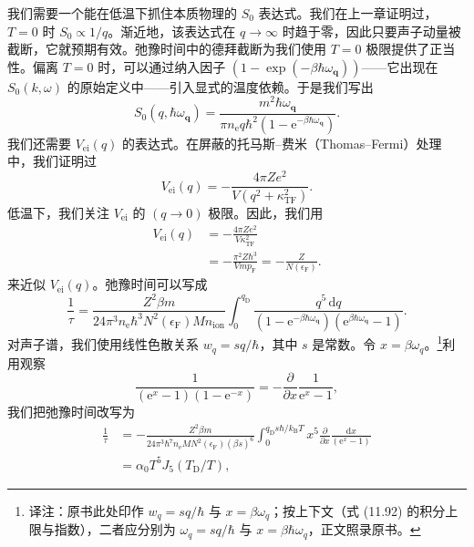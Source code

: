 我们需要一个能在低温下抓住本质物理的 $S_0$ 表达式。我们在上一章证明过，$T=0$ 时 $S_0\propto 1/q$。渐近地，该表达式在 $q\to\infty$ 时趋于零，因此只要声子动量被截断，它就预期有效。弛豫时间中的德拜截断为我们使用 $T=0$ 极限提供了正当性。偏离 $T=0$ 时，可以通过纳入因子 $(1-\exp(-\beta\hbar\omega_{\mathbf{q}}))$——它出现在 $S_0(k,\omega)$ 的原始定义中——引入显式的温度依赖。于是我们写出
\begin{equation*}
S_0(q,\hbar\omega_{\mathbf{q}})=\frac{m^2\hbar\omega_{\mathbf{q}}}{\pi n_{\mathrm{e}}q\hbar^2(1-\mathrm{e}^{-\beta\hbar\omega_{\mathbf{q}}})}.\tag{11.87}
\end{equation*}
我们还需要 $V_{\mathrm{ei}}(q)$ 的表达式。在屏蔽的托马斯–费米（Thomas--Fermi）处理中，我们证明过
\begin{equation*}
V_{\mathrm{ei}}(q)=-\frac{4\pi Ze^2}{V(q^2+\kappa_{\mathrm{TF}}^2)}.\tag{11.88}
\end{equation*}
低温下，我们关注 $V_{\mathrm{ei}}$ 的 $(q\to 0)$ 极限。因此，我们用
\begin{equation*}
\begin{aligned}
V_{\mathrm{ei}}(q)&=-\frac{4\pi Ze^2}{V\kappa_{\mathrm{TF}}^2}\\
&=-\frac{\pi^2Z\hbar^3}{Vmp_{\mathrm{F}}}=-\frac{Z}{N(\epsilon_{\mathrm{F}})}.
\end{aligned}\tag{11.89}
\end{equation*}
来近似 $V_{\mathrm{ei}}(q)$。弛豫时间可以写成
\begin{equation*}
\frac{1}{\tau}=\frac{Z^2\beta m}{24\pi^3 n_{\mathrm{e}}\hbar^3N^2(\epsilon_{\mathrm{F}})Mn_{\mathrm{ion}}}\int_0^{q_{\mathrm{D}}}\frac{q^5\,\mathrm{d}q}{(1-\mathrm{e}^{-\beta\hbar\omega_{\mathbf{q}}})(\mathrm{e}^{\beta\hbar\omega_{\mathbf{q}}}-1)}.\tag{11.90}
\end{equation*}
对声子谱，我们使用线性色散关系 $w_q=sq/\hbar$，其中 $s$ 是常数。令 $x=\beta\omega_q$。\footnote{译注：原书此处印作 $w_q=sq/\hbar$ 与 $x=\beta\omega_q$；按上下文（式 (11.92) 的积分上限与指数），二者应分别为 $\omega_q=sq/\hbar$ 与 $x=\beta\hbar\omega_q$，正文照录原书。}利用观察
\begin{equation*}
\frac{1}{(\mathrm{e}^x-1)(1-\mathrm{e}^{-x})}=-\frac{\partial}{\partial x}\frac{1}{\mathrm{e}^x-1},\tag{11.91}
\end{equation*}
我们把弛豫时间改写为
\begin{align*}
\frac{1}{\tau}&=-\frac{Z^2\beta m}{24\pi^3\hbar^7 n_{\mathrm{e}}MN^2(\epsilon_{\mathrm{F}})(\beta s)^6}\int_0^{q_{\mathrm{D}}s\hbar/k_{\mathrm{B}}T}x^5\frac{\partial}{\partial x}\frac{\mathrm{d}x}{(\mathrm{e}^x-1)}\\
&=\alpha_0T^5J_5(T_{\mathrm{D}}/T),\tag{11.92}
\end{align*}

